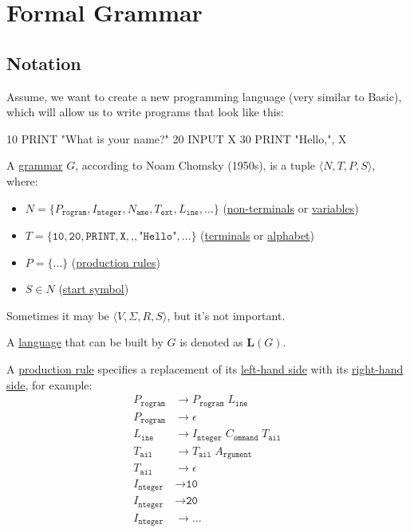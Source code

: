 \documentclass[sigsoft,12pt]{acmart}
\renewcommand\emph[1]{\ul{#1}}
\begin{document}
\section{Formal Grammar}

\subsection{Notation}

Assume, we want to create a new programming language (very similar to Basic),
which will allow us to write programs that look like this:

\begin{ffcode}
10 PRINT "What is your name?"
20 INPUT X
30 PRINT "Hello,", X
\end{ffcode}

A \emph{grammar} $G$, according to Noam Chomsky (1950s), is a tuple $\langle N, T, P, S\rangle$, where:
\begin{itemize}
  \item $N = \{ P_\texttt{rogram}, I_\texttt{nteger},
    N_\texttt{ame}, T_\texttt{ext}, L_\texttt{ine}, \dots \}$ (\emph{non-terminals} or \emph{variables})
  \item $T = \{ \texttt{10}, \texttt{20},
    \texttt{PRINT}, \texttt{X}, \texttt{,}, \texttt{"Hello"}, \dots \}$ (\emph{terminals} or \emph{alphabet})
  \item $P = \{ \dots \}$ (\emph{production rules})
  \item $S \in N$ (\emph{start symbol})
\end{itemize}

Sometimes it may be $\langle V, \Sigma, R, S\rangle$, but it's not important.

A \emph{language} that can be built by $G$ is denoted as $\bm{L}(G)$.

A \emph{production rule} specifies a replacement of its \emph{left-hand side} with its \emph{right-hand side}, for example:
\begin{equation*}
\begin{split}
P_\texttt{rogram} &\to P_\texttt{rogram} \; L_\texttt{ine} \\
P_\texttt{rogram} &\to \epsilon \\
L_\texttt{ine} &\to I_\texttt{nteger} \; C_\texttt{ommand} \; T_\texttt{ail} \\
T_\texttt{ail} &\to T_\texttt{ail} \; A_\texttt{rgument} \\
T_\texttt{ail} &\to \epsilon \\
I_\texttt{nteger} &\to \texttt{10} \\
I_\texttt{nteger} &\to \texttt{20} \\
I_\texttt{nteger} &\to \dots \\
\end{split}
\end{equation*}
\end{document}
